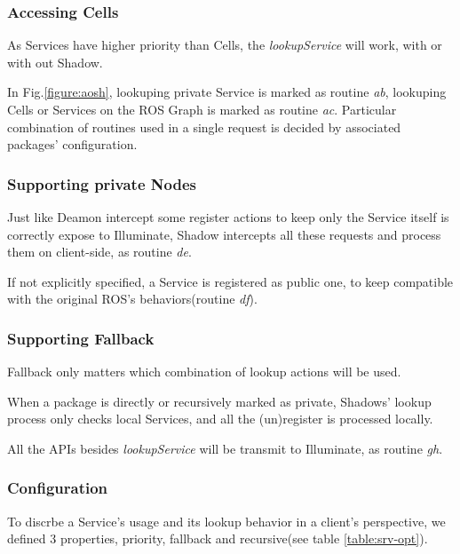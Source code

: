 \subsubsection{Accessing Cells}
As Services have higher priority than Cells, the \emph{lookupService} will
work, with or with out Shadow.

In Fig.\ref{figure:aosh}, lookuping private Service is marked as routine \emph{ab},
lookuping Cells or Services on the ROS Graph is marked as routine \emph{ac}.
Particular combination of routines used in a single request is decided by
associated packages' configuration.
 
\subsubsection{Supporting private Nodes}
Just like Deamon intercept some register actions to keep only the Service itself is
correctly expose to Illuminate, Shadow intercepts all these requests and process them
on client-side, as routine \emph{de}.

If not explicitly specified, a Service is registered as public one,
to keep compatible with the original ROS's behaviors(routine \emph{df}).

\subsubsection{Supporting Fallback}
Fallback only matters which combination of lookup actions will be used.

When a package is directly or recursively marked as private, Shadows' lookup 
process only checks local Services, and all the (un)register is processed locally.

All the APIs besides \emph{lookupService} will be transmit to Illuminate, 
as routine \emph{gh}.

\subsubsection{Configuration}
To discrbe a Service's usage and its lookup behavior in
a client's perspective, we defined 3 properties, priority,
fallback and recursive(see table \ref{table:srv-opt}).

